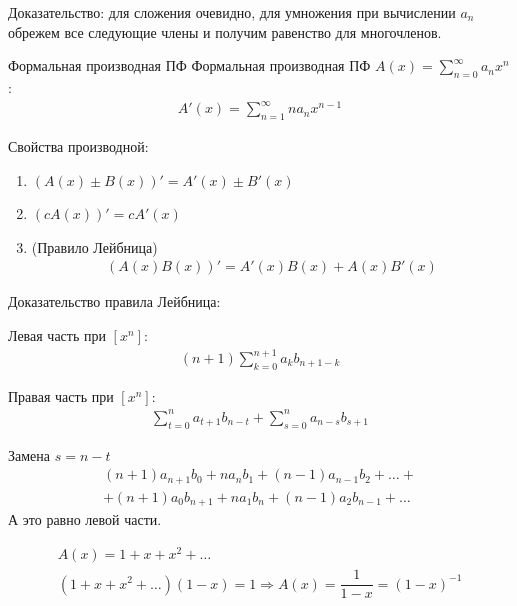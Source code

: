 Доказательство: для сложения очевидно, для умножения при вычислении \( a_n \) обрежем все следующие члены и получим равенство для многочленов.

\begin{defn}{Формальная производная ПФ}{}
    Формальная производная ПФ \( A(x) = \sum\limits_{n = 0}^{\infty} a_n x^n \):
    \begin{gather*}
        A'(x) = \sum\limits_{n = 1}^{\infty} n a_n x^{n - 1}
    \end{gather*}
\end{defn}

Свойства производной:

\begin{enumerate}
    \item \( (A(x) \pm B(x))' = A'(x) \pm B'(x) \)
    \item \( (c A(x))'  = c A'(x) \)
    \item (Правило Лейбница)
        \begin{gather*}
            (A(x)B(x))' = A'(x)B(x) + A(x)B'(x)
        \end{gather*}
\end{enumerate}

Доказательство правила Лейбница:

Левая часть при \( [x^n] \):
\begin{gather*}
    (n+1) \sum\limits_{k = 0}^{n + 1} a_k b_{n + 1 - k}
\end{gather*} 

Правая часть при \( [x^n] \):
\begin{gather*}
    \sum\limits_{t = 0}^{n} a_{t + 1} b_{n - t} + \sum\limits_{s = 0}^{n} a_{n - s} b_{s + 1}
\end{gather*} 

Замена \( s = n - t \)
\begin{gather*}
    (n + 1) a_{n + 1} b_0 + n a_n b_1 + (n - 1) a_{n - 1} b_2 + \ldots
    +
    \\
    +
    (n + 1) a_0 b_{n + 1} + n a_1 b_n + (n - 1) a_2 b_{n - 1} + \ldots
\end{gather*} 
А это равно левой части.

\begin{example}{}{}
    \begin{gather*}
        A(x) = 1 + x + x^2 + \ldots
        \\
        (1 + x + x^2 + \ldots)(1 - x) = 1 \Rightarrow A(x) = \dfrac{1}{1 - x} = (1 - x)^{-1}
    \end{gather*}
\end{example}

